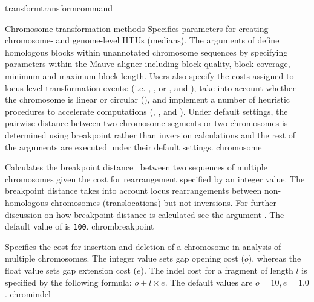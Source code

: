 \begin{command}{transform}{transformcommand}
\begin{arguments}
\begin{argumentgroup}{Chromosome transformation methods}
                {Specifies parameters for creating chro\-mosome- and genome-level HTUs (medians).
                The arguments of  define homologous blocks within unannotated chromosome sequences by
                specifying parameters within the Mauve aligner \cite{darlingetal2004} including block quality, block coverage, 	       		   	   
                minimum and maximum block length. Users also specify the costs assigned to locus-level transformation events:
                (i.e. , , or , and
                ), take into account whether the chromosome is linear or circular (), and
                implement a number of 	heuristic procedures to accelerate computations (, , 
                and ).  Under default settings, the pairwise distance between two chromosome segments or two 
                chromosomes is determined using breakpoint rather than inversion calculations and the rest of the arguments are executed 
                under their default settings.}
                {chromosome}
             
      		    {Calculates the breakpoint distance~\cite{blanchetteetal1997}
                between two sequences of multiple chromosomes given the cost for
                rearrangement specified by an integer value. The breakpoint distance
                takes into account locus rearrangements between non-homologous
                chromosomes (translocations) but not inversions. For further discussion on 
                how breakpoint distance is calculated see the argument .  
                The default value of  is \texttt{100}.} 
                {chrombreakpoint}
                        
                {Specifies the cost for insertion and deletion of a chromosome in analysis of
                multiple chromosomes. The integer value sets gap opening
                cost ($o$), whereas the float value sets gap extension
                cost ($e$).  The indel cost for a fragment of length $l$ is
                specified by the following formula:
                    $o + l \times e$. The default values are $o=10, e=1.0$.}
                {chromindel}
 

\end{argumentgroup}
\end{arguments}
\end{command}
